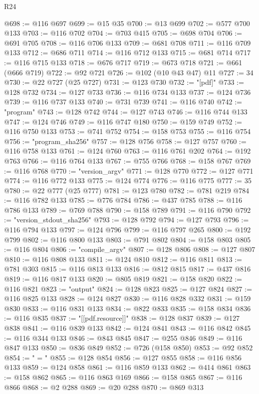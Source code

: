 \begin{lexlean}{R24}
\begin{coremodule}
{{{{{{{{{{{{{{{{{{{{{{{{{{{{{{{{{{{{{{{{{{{{{{{{{{{{{{{{{{{{{{{{{{{{{{{{{{{{{{{{{{{{{{{{{{{{{{{{{{{{{{{{{{{{{{{{{{{{{{{{{{{{{{{{{{{{{{{{{{{{{{{{{{{{{{{{{{{{{{{{{{{{{{{{{{{{{{{{{{{{{{{{{{{{{{{{{{{@698 := @116 @697
@699 := @15 @35
@700 := @13 @699
@702 := @577 @700 @133
@703 := @116 @702
@704 := @703 @415
@705 := @698 @704
@706 := @691 @705
@708 := @116 @706 @133
@709 := @681 @708
@711 := @116 @709 @133
@712 := @686 @711
@714 := @116 @712 @133
@715 := @681 @714
@717 := @116 @715 @133
@718 := @676 @717
@719 := @673 @718
@721 := @661 (@666 @719)
@722 := @92 @721
@726 := @102 (@10 @43 @47) @11
@727 := 34
@730 := @22 @727 (@25 @727)
@731 := @123 @730
@732 := "[pdf]"
@733 := @128 @732
@734 := @127 @733
@736 := @116 @734 @133
@737 := @124 @736
@739 := @116 @737 @133
@740 := @731 @739
@741 := @116 @740
@742 := "program"
@743 := @128 @742
@744 := @127 @743
@746 := @116 @744 @133
@747 := @124 @746
@749 := @116 @747 @180
@750 := @159 @749
@752 := @116 @750 @133
@753 := @741 @752
@754 := @158 @753
@755 := @116 @754
@756 := "program_sha256"
@757 := @128 @756
@758 := @127 @757
@760 := @116 @758 @133
@761 := @124 @760
@763 := @116 @761 @202
@764 := @192 @763
@766 := @116 @764 @133
@767 := @755 @766
@768 := @158 @767
@769 := @116 @768
@770 := "version_argv"
@771 := @128 @770
@772 := @127 @771
@774 := @116 @772 @133
@775 := @124 @774
@776 := @116 @775
@777 := 35
@780 := @22 @777 (@25 @777)
@781 := @123 @780
@782 := @781 @219
@784 := @116 @782 @133
@785 := @776 @784
@786 := @437 @785
@788 := @116 @786 @133
@789 := @769 @788
@790 := @158 @789
@791 := @116 @790
@792 := "version_stdout_sha256"
@793 := @128 @792
@794 := @127 @793
@796 := @116 @794 @133
@797 := @124 @796
@799 := @116 @797 @265
@800 := @192 @799
@802 := @116 @800 @133
@803 := @791 @802
@804 := @158 @803
@805 := @116 @804
@806 := "compile_argv"
@807 := @128 @806
@808 := @127 @807
@810 := @116 @808 @133
@811 := @124 @810
@812 := @116 @811
@813 := @781 @303
@815 := @116 @813 @133
@816 := @812 @815
@817 := @437 @816
@819 := @116 @817 @133
@820 := @805 @819
@821 := @158 @820
@822 := @116 @821
@823 := "output"
@824 := @128 @823
@825 := @127 @824
@827 := @116 @825 @133
@828 := @124 @827
@830 := @116 @828 @332
@831 := @159 @830
@833 := @116 @831 @133
@834 := @822 @833
@835 := @158 @834
@836 := @116 @835
@837 := "[[pdf.resource]]"
@838 := @128 @837
@839 := @127 @838
@841 := @116 @839 @133
@842 := @124 @841
@843 := @116 @842
@845 := @116 @344 @133
@846 := @843 @845
@847 := @255 @846
@849 := @116 @847 @133
@850 := @836 @849
@852 := @726 (@158 @850)
@853 := @92 @852
@854 := " = "
@855 := @128 @854
@856 := @127 @855
@858 := @116 @856 @133
@859 := @124 @858
@861 := @116 @859 @133
@862 := @414 @861
@863 := @158 @862
@865 := @116 @863 @169
@866 := @158 @865
@867 := @116 @866
@868 := @2 @288
@869 := @20 @288
@870 := @869 @313
}}}}}}}}}}}}}}}}}}}}}}}}}}}}}}}}}}}}}}}}}}}}}}}}}}}}}}}}}}}}}}}}}}}}}}}}}}}}}}}}}}}}}}}}}}}}}}}}}}}}}}}}}}}}}}}}}}}}}}}}}}}}}}}}}}}}}}}}}}}}}}}}}}}}}}}}}}}}}}}}}}}}}}}}}}}}}}}}}}}}}}}}}}}}}}}}}}}
\end{coremodule}
\end{lexlean}
